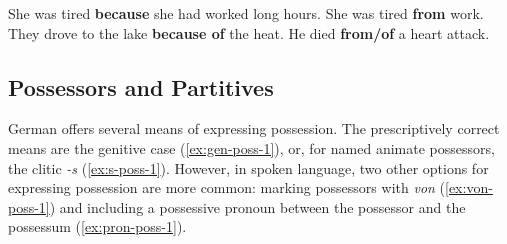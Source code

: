 \documentclass[lucida]{sp} %
\begin{document}
\begin{exe}
\ex  \label{ex:because-cause-1} She was tired \textbf{because} she had worked long hours.
\ex \label{ex:from-cause-1} She was tired \textbf{from} work.
\ex \label{ex:because-of-cause-1}They drove to the lake \textbf{because of} the heat.
\ex \label{ex:die-from-cause-1} He died \textbf{from/of} a heart attack.
\end{exe}





\subsection{Possessors and Partitives}

German offers several means of expressing possession. The prescriptively correct means are 
the genitive case (\ref{ex:gen-poss-1}), or, for named animate possessors, the clitic \textit{-s} (\ref{ex:s-poss-1}). 
However, in spoken language, two other options for expressing possession are more common: marking 
possessors with \textit{von} (\ref{ex:von-poss-1}) and including a possessive pronoun between the possessor and the possessum (\ref{ex:pron-poss-1}).
\end{document}

